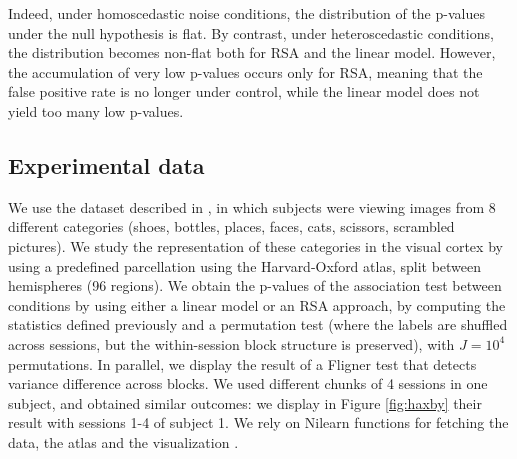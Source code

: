 \documentclass{article}
\begin{document}
Indeed, under homoscedastic noise conditions, the distribution of the
p-values under the null hypothesis is flat. By contrast, under
heteroscedastic conditions, the distribution becomes non-flat both for
RSA and the linear model. However, the accumulation of very low
p-values occurs only for RSA, meaning that the false positive rate is
no longer under control, while the linear model does not yield too
many low p-values.

\subsection{Experimental data}

We use the dataset described in \cite{Haxby2001}, in which subjects
were viewing images from 8 different categories (shoes, bottles,
places, faces, cats, scissors, scrambled pictures). We study the
representation of these categories in the visual cortex by using a
predefined parcellation using the Harvard-Oxford atlas, split between
hemispheres (96 regions).
%
We obtain the p-values of the association test between conditions by
using either a linear model or an RSA approach, by computing the
statistics defined previously and a permutation test (where the labels
are shuffled %
across sessions, but the within-session block
structure is preserved), with $J=10^4$ permutations.
%
In parallel, we display the result of a Fligner test that detects
variance difference across blocks.
%
We used different chunks of 4 sessions in one subject, and obtained
similar outcomes: we display in Figure \ref{fig:haxby} their result with
sessions 1-4 of subject 1.
%
We rely on Nilearn functions for fetching the data, the atlas and
the visualization \cite{Abraham2014}.
\end{document}

